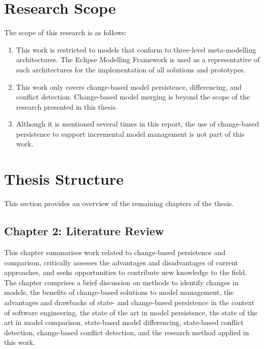 \section{Research Scope}
\label{sec:research_scope}
The scope of this research is as follows:
\begin{enumerate}
  \item This work is restricted to models that conform to three-level meta-modelling architectures. The Eclipse Modelling Framework is used as a representative of such architectures for the implementation of all solutions and prototypes.
  \item This work only covers change-based model persistence, differencing, and conflict detection. Change-based model merging is beyond the scope of the research presented in this thesis.
  \item Although it is mentioned several times in this report, the use of change-based persistence to support incremental model management is not part of this work.
\end{enumerate}

\section{Thesis Structure}
\label{sec:Thesis Structure}
This section provides an overview of the remaining chapters of the thesis.


\subsection{Chapter 2: Literature Review}
\label{sec:chapter_2_literature_review_plan}
This chapter summarises work related to change-based persistence and comparison, critically assesses the advantages and disadvantages of current approaches, and seeks opportunities to contribute new knowledge to the field. The chapter comprises a brief discussion on methods to identify changes in models, the benefits of change-based solutions to model management, the advantages and drawbacks of state- and change-based persistence in the context of software engineering, the state of the art in model persistence, the state of the art in model comparison, state-based model differencing, state-based conflict detection, change-based conflict detection, and the research method applied in this work.

